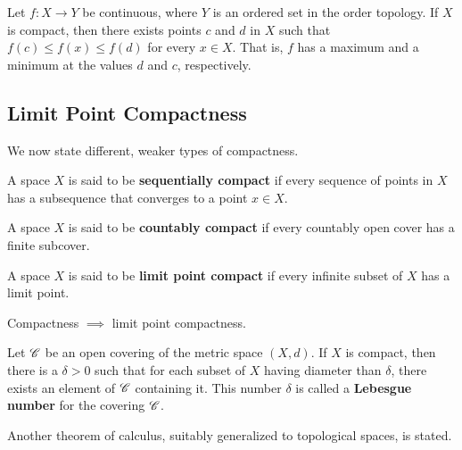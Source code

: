     \begin{theorem}
      Let $f: X \rightarrow Y$ be continuous, where $Y$ is an ordered set in the order topology. If $X$ is compact, then there exists points $c$ and $d$ in $X$ such that $f(c) \leq f(x) \leq f(d)$ for every $x \in X$. That is, $f$ has a maximum and a minimum at the values $d$ and $c$, respectively. 
    \end{theorem}

  \subsection{Limit Point Compactness}

    We now state different, weaker types of compactness. 

    \begin{definition}
      A space $X$ is said to be \textbf{sequentially compact} if every sequence of points in $X$ has a subsequence that converges to a point $x \in X$. 
    \end{definition}

    \begin{definition}
      A space $X$ is said to be \textbf{countably compact} if every countably open cover has a finite subcover. 
    \end{definition}

    \begin{definition}
      A space $X$ is said to be \textbf{limit point compact} if every infinite subset of $X$ has a limit point. 
    \end{definition}

    \begin{theorem}
      Compactness $\implies$ limit point compactness.  
    \end{theorem}

    \begin{lemma}
      Let $\operatorname{\mathscr{C}}$ be an open covering of the metric space $(X, d)$. If $X$ is compact, then there is a $\delta > 0$ such that for each subset of $X$ having diameter than $\delta$, there exists an element of $\operatorname{\mathscr{C}}$ containing it. This number $\delta$ is called a \textbf{Lebesgue number} for the covering $\operatorname{\mathscr{C}}$. 
    \end{lemma}

    Another theorem of calculus, suitably generalized to topological spaces, is stated. 

